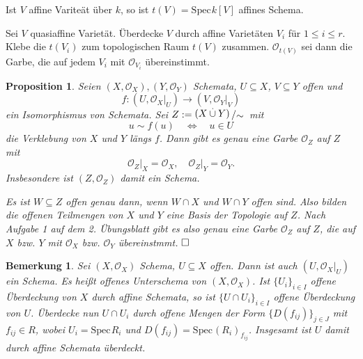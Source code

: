 \documentclass[11pt]{book}
\newtheorem{proposition}[theorem]{Proposition}
\newtheorem{remark}[theorem]{Bemerkung}
\theoremstyle{nonumberbreak}
\newenvironment{pr}[1][]{\ifthenelse{\equal{#1}{}}{\proof}{\proof[#1]}\rm}{\endproof}
\newenvironment{ex}[1][]{\ifthenelse{\equal{#1}{}}{\example}{\example[#1]}\rm}{\endexample}
\newcommand{\spec}{\mathrm{Spec} \hspace{1pt} }
\newcommand{\K}{k}
\newcommand{\slant}[2]{{\raisebox{.1em}{$#1$}\left/\raisebox{-.1em}{$#2$}\right.}}
\begin{document}
\begin{spacing}{1.4}
\begin{ex}   %

\begin{compactenum}
\item Ist $V$ affine Variteät über $k$, so ist $t(V)= \spec \K [V]$ affines Schema.
\item Sei $V$ quasiaffine Varietät. Überdecke $V$ durch affine Varietäten $V_i$ für $1 \leqslant i \leqslant r$. Klebe die $t(V_i)$ zum topologischen Raum $t(V)$ zusammen. $\mathcal{O}_{t(V)}$ sei dann die Garbe, die auf jedem $V_i$ mit $\mathcal{O}_{V_i}$ übereinstimmt.
\end{compactenum}
\end{ex}


\begin{proposition}  %

Seien $\left(X, \mathcal{O}_X\right), \left(Y, \mathcal{O}_Y\right)$ Schemata, $U \subseteq X$, $V \subseteq Y$ offen und 
$$f: \left(U, \mathcal{O}_X \vert_U \right) \longrightarrow \left(V, \mathcal{O}_Y \vert_V \right)$$
ein Isomorphismus von Schemata. Sei $Z:= \slant{(X \overset{.}{\cup} Y)}{\sim}$ mit 
$$u \sim f(u) \quad \Longleftrightarrow \quad u \in U$$
die \rm{Verklebung von} $X$ \rm{und} $Y$ \rm{längs} \it $f$. Dann gibt es genau eine Garbe $\mathcal{O}_Z$ auf $Z$ mit 
$$\mathcal{O}_Z \vert_X = \mathcal{O}_X, \quad \mathcal{O}_Z \vert_Y = \mathcal{O}_Y.$$
Insbesondere ist $(Z, \mathcal{O}_Z)$ damit ein Schema.

\begin{pr}
Es ist $W \subseteq Z$ offen genau dann, wenn $W \cap X$ und $W \cap Y$ offen sind. Also bilden die offenen Teilmengen von $X$ und $Y$ eine Basis der Topologie auf $Z$. Nach Aufgabe 1 auf dem 2. Übungsblatt gibt es also genau eine Garbe $\mathcal{O}_Z$ auf $Z$, die auf $X$ bzw. $Y$ mit $\mathcal{O}_X$ bzw. $\mathcal{O}_Y$ übereinstmmt. $\hfill \Box$
\end{pr}
\end{proposition}

\begin{remark}

Sei $(X, \mathcal{O}_X)$ Schema, $U \subseteq X$ offen. Dann ist auch $(U, \mathcal{O}_X \vert_U)$ ein Schema. Es heißt \textit{offenes Unterschema} von $(X, \mathcal{O}_X)$. 
\begin{pr}
Ist $\{U_i\}_{i \in I}$ offene Überdeckung von $X$ durch affine Schemata, so ist $\{U \cap U_i\}_{i \in I}$ offene Überdeckung von $U$. Überdecke nun $U \cap U_i$ durch offene Mengen der Form $\{D(f_{ij})\}_{j \in J}$ mit $f_{ij} \in R$, wobei $U_i = \spec R_i$ und $D(f_{ij}) = \spec (R_i)_{f_{ij}}$. Insgesamt ist $U$ damit durch affine Schemata überdeckt.
\end{pr}
\end{remark}


\end{spacing}
\end{document}

